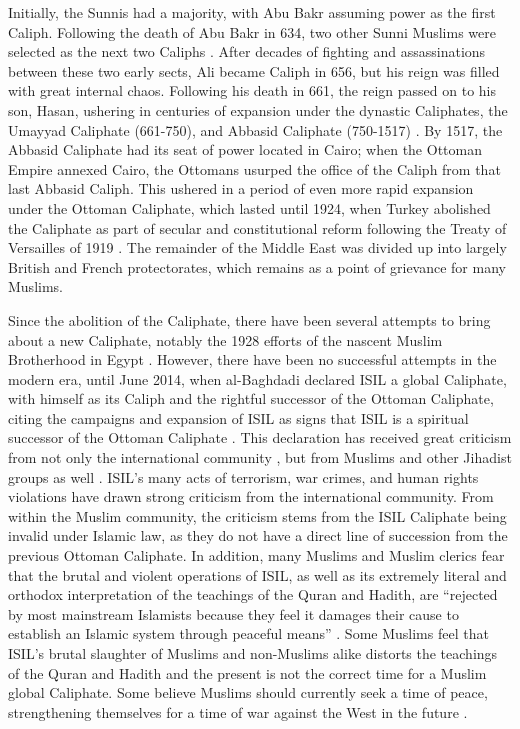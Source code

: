 \documentclass{report}
\begin{document}
Initially, the Sunnis had a majority, with Abu Bakr assuming power as the first Caliph. Following the death of Abu Bakr in 634, two other Sunni Muslims were selected as the next two Caliphs \cite{schmidt2004great}. After decades of fighting and assassinations between these two early sects, Ali became Caliph in 656, but his reign was filled with great internal chaos. Following his death in 661, the reign passed on to his son, Hasan, ushering in centuries of expansion under the dynastic Caliphates, the Umayyad Caliphate (661-750), and Abbasid Caliphate (750-1517) \cite{schmidt2004great,oliver2009caliphate}. By 1517, the Abbasid Caliphate had its seat of power located in Cairo; when the Ottoman Empire annexed Cairo, the Ottomans usurped the office of the Caliph from that last Abbasid Caliph. This ushered in a period of even more rapid expansion under  the Ottoman Caliphate, which lasted until 1924, when Turkey abolished the Caliphate as part of secular and constitutional reform following the Treaty of Versailles of 1919 \cite{schmidt2004great,ozoglu2011caliphate}. The remainder of the Middle East was divided up into largely British and French protectorates, which remains as a point of grievance for many Muslims.

Since the abolition of the Caliphate, there have been several attempts to bring about a new Caliphate, notably the  1928 efforts of the nascent Muslim Brotherhood in Egypt \cite{Tolson2008,gabriel2008they}. However, there have been no successful attempts in the modern era, until  June 2014, when al-Baghdadi declared ISIL a global Caliphate, with himself as its Caliph and the rightful successor of the Ottoman Caliphate, citing the campaigns and expansion of ISIL as signs that ISIL is a spiritual successor of the Ottoman Caliphate \cite{Mortada2014,TheWeek2014}.  This declaration has received great criticism from not only the international community \cite{Gomes2007}, but from Muslims and other Jihadist groups as well \cite{Mandhai2014,Moore2014}. ISIL's many acts of terrorism, war crimes, and human rights violations have drawn strong criticism from the international community. From within the Muslim community, the criticism stems from the ISIL Caliphate being invalid under Islamic law, as they do not have a direct line of succession from the previous Ottoman Caliphate. In addition, many Muslims and Muslim clerics fear that the brutal and violent operations of ISIL, as well as its extremely literal and orthodox interpretation of the teachings of  the Quran and Hadith, are \enquote{rejected by most mainstream Islamists because they feel it damages their cause to establish an Islamic system through peaceful means} \cite{Mandhai2014}. Some Muslims feel that ISIL's brutal slaughter of Muslims and non-Muslims alike distorts the teachings of the Quran and Hadith and the present is not the correct time for a Muslim global Caliphate. Some believe Muslims  should currently seek a time of peace, strengthening themselves for a time of war against the West in the future \cite{schmidt2004great,Moore2014,Wood2015}.
\end{document}
